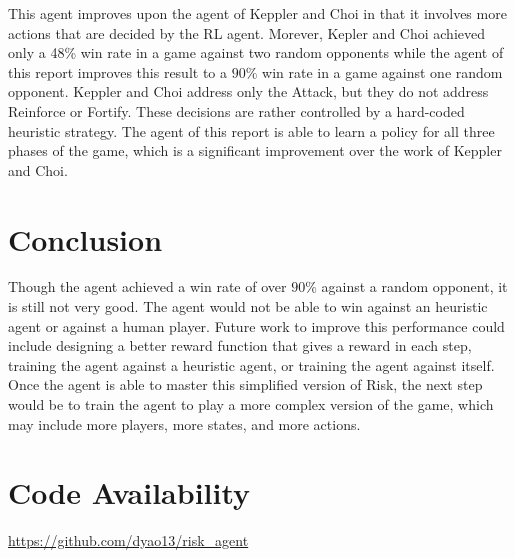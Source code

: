 \documentclass[final,5p,times,twocolumn]{elsarticle}
\begin{document}
This agent improves upon the agent of Keppler and Choi in that it involves more actions that are decided by the RL agent. Morever, Kepler and Choi achieved only a 48\% win rate in a game against two random opponents while the agent of this report improves this result to a $90\%$ win rate in a game against one random opponent. Keppler and Choi address only the Attack, but they do not address Reinforce or Fortify. These decisions are rather controlled by a hard-coded heuristic strategy. The agent of this report is able to learn a policy for all three phases of the game, which is a significant improvement over the work of Keppler and Choi.

\section{Conclusion}
\label{sec:concl}

Though the agent achieved a win rate of over $90\%$ against a random opponent, it is still not very good. The agent would not be able to win against an heuristic agent or against a human player. Future work to improve this performance could include designing a better reward function that gives a reward in each step, training the agent against a heuristic agent, or training the agent against itself. Once the agent is able to master this simplified version of Risk, the next step would be to train the agent to play a more complex version of the game, which may include more players, more states, and more actions.

\section{Code Availability}
\label{sec:code}
\href{https://github.com/dyao13/risk\_agent}{https://github.com/dyao13/risk\_agent}

 

\end{document}
